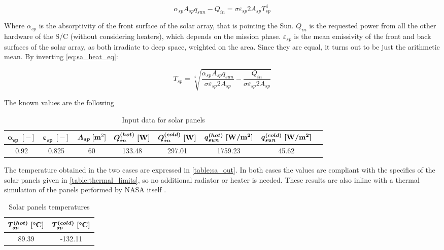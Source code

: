 \begin{equation}
    \alpha_{sp}A_{sp} q_{sun} - Q_{in} = \sigma \varepsilon_{sp} 2 A_{sp} T_{sp}^4
    \label{eq:sa_heat_eq}
\end{equation}

Where $\alpha_{sp}$ is the absorptivity of the front surface of the solar array, that is pointing the Sun. $Q_{in}$ is the requested power from all the other hardware of the S/C (without considering heaters), which depends on the mission phase. $\varepsilon_{sp}$ is the mean emissivity of the front and back surfaces of the solar array, as both irradiate to deep space, weighted on the area. Since they are equal, it turns out to be just the arithmetic mean. 
By inverting \autoref{eq:sa_heat_eq}:

\begin{equation}
    T_{sp} = \sqrt [4] {\frac{\alpha_{sp}A_{sp} q_{sun}}{\sigma  \varepsilon_{sp}2 A_{sp}} - \frac{Q_{in}}{\sigma \varepsilon_{sp}2 A_{sp}}}
\end{equation}

The known values are the following

\begin{table}[H]
    \renewcommand{\arraystretch}{1.5}
    \centering
    \begin{tabular}{|c|c|c|c|c|c|c|c|}
        \hline
        $\boldsymbol{\alpha_{sp} \; [-]}$ & $\boldsymbol{\varepsilon_{sp} \; [-]}$ & $\boldsymbol{A_{sp}}\;[\textrm{\textbf{m}}^2]$ & $\boldsymbol{Q_{in}^{(hot)} \; [\textrm{\textbf{W}}]}$ & $\boldsymbol{Q_{in}^{(cold)} \; [\textrm{\textbf{W}}]}$ & $\boldsymbol{q_{sun}^{(hot)} \; [\textrm{\textbf{W}}/\textrm{\textbf{m}}^2]}$ & $\boldsymbol{q_{sun}^{(cold)} \; [\textrm{\textbf{W}}/\textrm{\textbf{m}}^2]}$ \\
        \hline
        0.92 & 0.825 & 60 &  133.48 & 297.01 & 1759.23 & 45.62 \\
        \hline
    \end{tabular}
    \caption{Input data for solar panels}
    \label{table:sa_data}
\end{table}

The temperature obtained in the two cases are expressed in \autoref{table:sa_out}. 
In both cases the values are compliant with the specifics of the solar panels given in \autoref{table:thermal_limits}, so no additional radiator or heater is needed. These results are also inline with a thermal simulation of the panels performed by NASA itself \cite{solar_panels_coef}.

\begin{table}[H]
    \renewcommand{\arraystretch}{1.5}
    \centering
    \begin{tabular}{|c|c|}
        \hline
        $\boldsymbol{T_{sp}^{(hot)} \; [\textrm{\textbf{°C}}]}$ & $\boldsymbol{T_{sp}^{(cold)} \; [\textrm{\textbf{°C}}]}$ \\
        \hline
        89.39 & -132.11 \\
        \hline
    \end{tabular}
    \caption{Solar panels temperatures}
    \label{table:sa_out}
\end{table}


